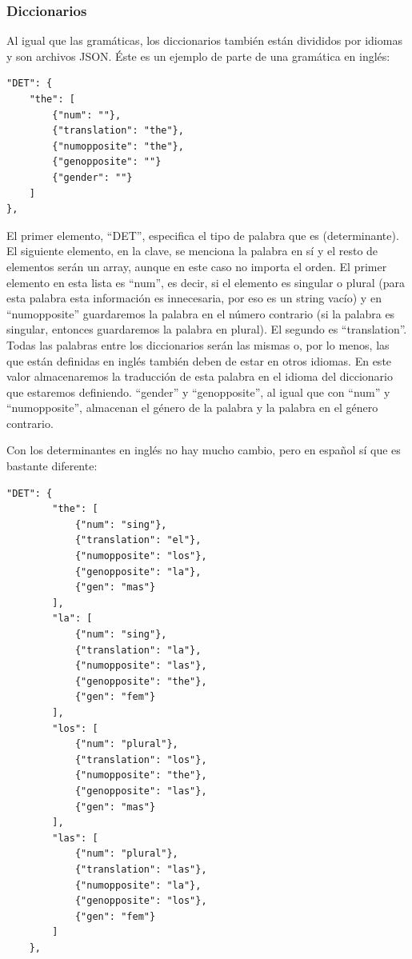 \subsubsection{Diccionarios}

Al igual que las gramáticas, los diccionarios también están divididos por idiomas y son archivos JSON. Éste es un ejemplo de parte de una gramática en inglés:

\begin{lstlisting}[style=json]
"DET": {
    "the": [
        {"num": ""},
        {"translation": "the"},
        {"numopposite": "the"},
        {"genopposite": ""}
        {"gender": ""}
    ]
},
\end{lstlisting}

El primer elemento, ``DET'', especifica el tipo de palabra que es (determinante). El siguiente elemento, en la clave, se menciona la palabra en sí y el resto de elementos serán un array, aunque en este caso no importa el orden. El primer elemento en esta lista es ``num'', es decir, si el elemento es singular o plural (para esta palabra esta información es innecesaria, por eso es un string vacío) y en ``numopposite'' guardaremos la palabra en el número contrario (si la palabra es singular, entonces guardaremos la palabra en plural).
El segundo es ``translation''. Todas las palabras entre los diccionarios serán las mismas o, por lo menos, las que están definidas en inglés también deben de estar en otros idiomas. En este valor almacenaremos la traducción de esta palabra en el idioma del diccionario que estaremos definiendo.
``gender'' y ``genopposite'', al igual que con ``num'' y ``numopposite'', almacenan el género de la palabra y la palabra en el género contrario.

Con los determinantes en inglés no hay mucho cambio, pero en español sí que es bastante diferente:

\begin{lstlisting}[style=json]
"DET": {
        "the": [
            {"num": "sing"},
            {"translation": "el"},
            {"numopposite": "los"},
            {"genopposite": "la"},
            {"gen": "mas"}
        ],
        "la": [
            {"num": "sing"},
            {"translation": "la"},
            {"numopposite": "las"},
            {"genopposite": "the"},
            {"gen": "fem"}
        ],
        "los": [
            {"num": "plural"},
            {"translation": "los"},
            {"numopposite": "the"},
            {"genopposite": "las"},
            {"gen": "mas"}
        ],
        "las": [
            {"num": "plural"},
            {"translation": "las"},
            {"numopposite": "la"},
            {"genopposite": "los"},
            {"gen": "fem"}
        ]
    },
\end{lstlisting}

